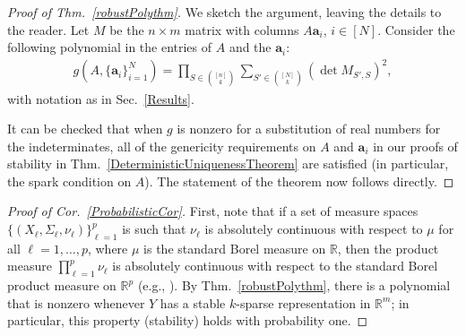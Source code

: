 \documentclass[journal, twocolumn]{IEEEtran}
\newtheorem{lemma}{Lemma}
\begin{document}
\begin{proof}[Proof of Thm.~\ref{robustPolythm}]
We sketch the argument, leaving the details to the reader.
Let $M$ be the $n \times m$ matrix with columns $A\mathbf{a}_i$, $i \in [N]$.  Consider the following polynomial \cite[Sec.~IV]{Hillar15} in the entries of $A$ and the $\mathbf{a}_i$:
\begin{align*}
g(A, \{\mathbf{a}_i\}_{i=1}^N) = \prod_{S \in {[n] \choose k}} \sum_{S' \in {[N] \choose k}} (\det M_{S',S})^2,
\end{align*}
with notation as in Sec.~\ref{Results}.  

It can be checked that when $g$ is nonzero for a substitution of real numbers for the indeterminates, all of the genericity requirements on $A$ and $\mathbf{a}_i$ in our proofs of stability in Thm.~\ref{DeterministicUniquenessTheorem} are satisfied (in particular, the spark condition on $A$). The statement of the theorem now follows directly.
\end{proof}

 \begin{proof}[Proof of Cor.~\ref{ProbabilisticCor}]
First, note that if a set of measure spaces $\{(X_{\ell}, \Sigma_{\ell}, \nu_{\ell})\}_{\ell=1}^p$ is such that $\nu_{\ell}$ is absolutely continuous with respect to $\mu$ for all $\ell = 1, \ldots, p$, where $\mu$ is the standard Borel measure on $\mathbb{R}$, then the product measure $\prod_{\ell=1}^p \nu_{\ell}$ is absolutely continuous with respect to the standard Borel product measure on $\mathbb{R}^p$ (e.g.,  \cite{folland2013real}). By Thm.~\ref{robustPolythm}, there is a polynomial that is nonzero whenever $Y$ has a stable $k$-sparse representation in $\mathbb R^m$; in particular, this property (stability) holds with probability one.
\end{proof}
\end{document}
